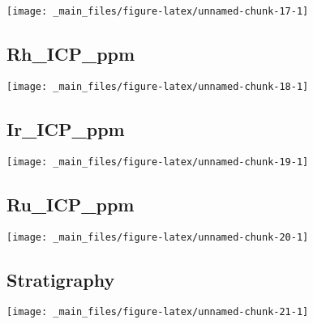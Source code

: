 \documentclass[
]{article}
\begin{document}
\begin{center}\texttt{[image: \_main\_files/figure-latex/unnamed-chunk-17-1]} \end{center}

\hypertarget{rh_icp_ppm}{%
\subsection{Rh\_ICP\_ppm}\label{rh_icp_ppm}}

\begin{center}\texttt{[image: \_main\_files/figure-latex/unnamed-chunk-18-1]} \end{center}

\hypertarget{ir_icp_ppm}{%
\subsection{Ir\_ICP\_ppm}\label{ir_icp_ppm}}

\begin{center}\texttt{[image: \_main\_files/figure-latex/unnamed-chunk-19-1]} \end{center}

\hypertarget{ru_icp_ppm}{%
\subsection{Ru\_ICP\_ppm}\label{ru_icp_ppm}}

\begin{center}\texttt{[image: \_main\_files/figure-latex/unnamed-chunk-20-1]} \end{center}

\hypertarget{stratigraphy}{%
\subsection{Stratigraphy}\label{stratigraphy}}

\begin{center}\texttt{[image: \_main\_files/figure-latex/unnamed-chunk-21-1]} \end{center}

\newpage
\end{document}

